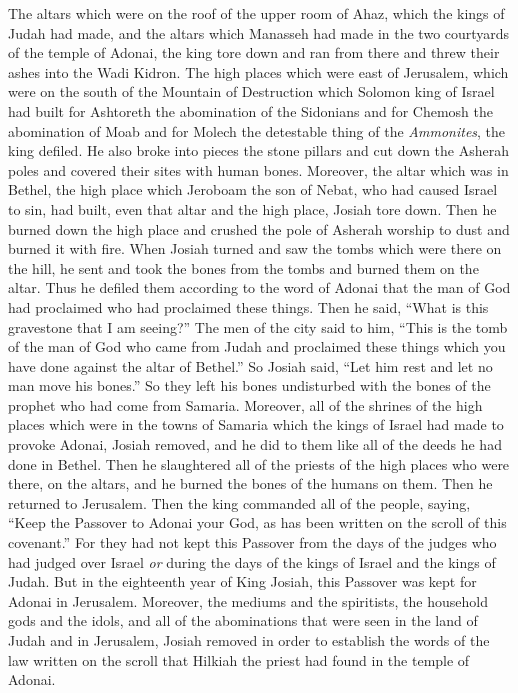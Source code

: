 \begin{biblechapter}
\verse The altars which were on the roof of the upper room of Ahaz, which the kings of Judah had made, and the altars which Manasseh had made in the two courtyards of the temple of Adonai, the king tore down and ran from there and threw their ashes into the Wadi Kidron.
\verse The high places which were east of Jerusalem, which were on the south of the Mountain of Destruction which Solomon king of Israel had built for Ashtoreth the abomination of the Sidonians and for Chemosh the abomination of Moab and for Molech the detestable thing of the \textit{Ammonites}, the king defiled.
\verse He also broke into pieces the stone pillars and cut down the Asherah poles and covered their sites with human bones.
\verse Moreover, the altar which was in Bethel, the high place which Jeroboam the son of Nebat, who had caused Israel to sin, had built, even that altar and the high place, Josiah tore down. Then he burned down the high place and crushed the pole of Asherah worship to dust and burned it with fire.
\verse When Josiah turned and saw the tombs which were there on the hill, he sent and took the bones from the tombs and burned them on the altar. Thus he defiled them according to the word of Adonai that the man of God had proclaimed who had proclaimed these things.
\verse Then he said, “What is this gravestone that I am seeing?” The men of the city said to him, “This is the tomb of the man of God who came from Judah and proclaimed these things which you have done against the altar of Bethel.”
\verse So Josiah said, “Let him rest and let no man move his bones.” So they left his bones undisturbed with the bones of the prophet who had come from Samaria.
\verse Moreover, all of the shrines of the high places which were in the towns of Samaria which the kings of Israel had made to provoke Adonai, Josiah removed, and he did to them like all of the deeds he had done in Bethel.
\verse Then he slaughtered all of the priests of the high places who were there, on the altars, and he burned the bones of the humans on them. Then he returned to Jerusalem.
 Then the king commanded all of the people, saying, “Keep the Passover to Adonai your God, as has been written on the scroll of this covenant.”
\verse For they had not kept this Passover from the days of the judges who had judged over Israel \textit{or} during the days of the kings of Israel and the kings of Judah.
\verse But in the eighteenth year of King Josiah, this Passover was kept for Adonai in Jerusalem.
\verse Moreover, the mediums and the spiritists, the household gods and the idols, and all of the abominations that were seen in the land of Judah and in Jerusalem, Josiah removed in order to establish the words of the law written on the scroll that Hilkiah the priest had found in the temple of Adonai.

\end{biblechapter}
